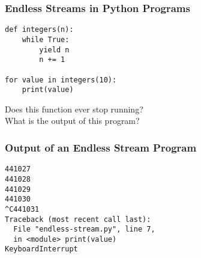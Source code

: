 \documentclass[14pt,aspectratio=169]{beamer}
\begin{document}
%
\begin{frame}[fragile]
  \frametitle{Endless Streams in Python Programs}
  \normalsize
  \begin{minipage}{6in}
    \vspace*{.1in}
    \begin{verbatim}
def integers(n):
    while True:
        yield n
        n += 1

for value in integers(10):
    print(value)
    \end{verbatim}
  \end{minipage}
  \vspace*{.05in}
  \begin{center}
    \normalsize \noindent Does this function ever stop running? \\
    \normalsize \noindent What is the output of this program? \\
  \end{center}
\end{frame}

%
\begin{frame}[fragile]
  \frametitle{Output of an Endless Stream Program}
  \normalsize
  \begin{minipage}{6in}
    \vspace*{.1in}
    \begin{verbatim}
441027
441028
441029
441030
^C441031
Traceback (most recent call last):
  File "endless-stream.py", line 7,
  in <module> print(value)
KeyboardInterrupt
    \end{verbatim}
  \end{minipage}
\end{frame}
\end{document}
